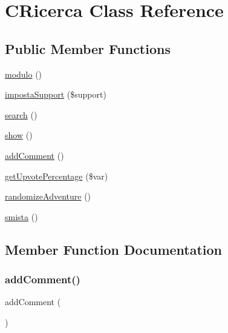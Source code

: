 \hypertarget{class_c_ricerca}{}\section{C\+Ricerca Class Reference}
\label{class_c_ricerca}
\subsection*{Public Member Functions}
\begin{DoxyCompactItemize}
\item 
\mbox{\hyperlink{class_c_ricerca_ae049a865cd77c4182dd44281b313b545}{modulo}} ()
\item 
\mbox{\hyperlink{class_c_ricerca_a47bd6f2007e7b0b5958bbb079e32cc22}{imposta\+Support}} (\$support)
\item 
\mbox{\hyperlink{class_c_ricerca_a796bf438724e047aeef18579732a3780}{search}} ()
\item 
\mbox{\hyperlink{class_c_ricerca_a2b8e3779f5bd8c38f70307574859bd36}{show}} ()
\item 
\mbox{\hyperlink{class_c_ricerca_a564645b21e8986c7a4271a721216fcb4}{add\+Comment}} ()
\item 
\mbox{\hyperlink{class_c_ricerca_a10b8a67c58f8c91b47c1ece8959754be}{get\+Upvote\+Percentage}} (\$var)
\item 
\mbox{\hyperlink{class_c_ricerca_a1882c9da84dc67772d89caa949280531}{randomize\+Adventure}} ()
\item 
\mbox{\hyperlink{class_c_ricerca_afc7ba180569cef3535974cfc4a1211f1}{smista}} ()
\end{DoxyCompactItemize}


\subsection{Member Function Documentation}
\mbox{\label{class_c_ricerca_a564645b21e8986c7a4271a721216fcb4}} 
\subsubsection{\texorpdfstring{add\+Comment()}{addComment()}}
{\footnotesize\ttfamily add\+Comment (\begin{DoxyParamCaption}{ }\end{DoxyParamCaption})}

